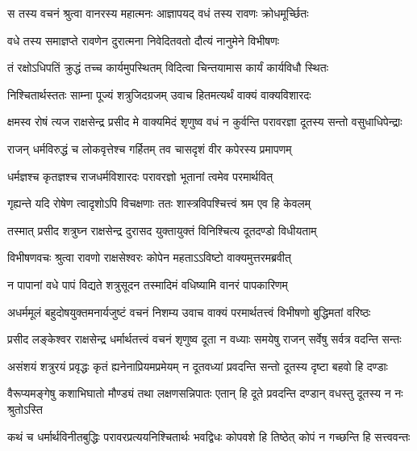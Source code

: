 
\twolineshloka
{स तस्य वचनं श्रुत्वा वानरस्य महात्मनः}
{आज्ञापयद् वधं तस्य रावणः क्रोधमूर्च्छितः} %

\twolineshloka
{वधे तस्य समाज्ञप्ते रावणेन दुरात्मना}
{निवेदितवतो दौत्यं नानुमेने विभीषणः} %

\twolineshloka
{तं रक्षोऽधिपतिं क्रुद्धं तच्च कार्यमुपस्थितम्}
{विदित्वा चिन्तयामास कार्यं कार्यविधौ स्थितः} %

\twolineshloka
{निश्चितार्थस्ततः साम्ना पूज्यं शत्रुजिदग्रजम्}
{उवाच हितमत्यर्थं वाक्यं वाक्यविशारदः} %

\twolineshloka
{क्षमस्व रोषं त्यज राक्षसेन्द्र प्रसीद मे वाक्यमिदं शृणुष्व}
{वधं न कुर्वन्ति परावरज्ञा दूतस्य सन्तो वसुधाधिपेन्द्राः} %

\twolineshloka
{राजन् धर्मविरुद्धं च लोकवृत्तेश्च गर्हितम्}
{तव चासदृशं वीर कपेरस्य प्रमापणम्} %

\twolineshloka
{धर्मज्ञश्च कृतज्ञश्च राजधर्मविशारदः}
{परावरज्ञो भूतानां त्वमेव परमार्थवित्} %

\twolineshloka
{गृह्यन्ते यदि रोषेण त्वादृशोऽपि विचक्षणाः}
{ततः शास्त्रविपश्चित्त्वं श्रम एव हि केवलम्} %

\twolineshloka
{तस्मात् प्रसीद शत्रुघ्न राक्षसेन्द्र दुरासद}
{युक्तायुक्तं विनिश्चित्य दूतदण्डो विधीयताम्} %

\twolineshloka
{विभीषणवचः श्रुत्वा रावणो राक्षसेश्वरः}
{कोपेन महताऽऽविष्टो वाक्यमुत्तरमब्रवीत्} %

\twolineshloka
{न पापानां वधे पापं विद्यते शत्रुसूदन}
{तस्मादिमं वधिष्यामि वानरं पापकारिणम्} %

\twolineshloka
{अधर्ममूलं बहुदोषयुक्तमनार्यजुष्टं वचनं निशम्य}
{उवाच वाक्यं परमार्थतत्त्वं विभीषणो बुद्धिमतां वरिष्ठः} %

\twolineshloka
{प्रसीद लङ्केश्वर राक्षसेन्द्र धर्मार्थतत्त्वं वचनं शृणुष्व}
{दूता न वध्याः समयेषु राजन् सर्वेषु सर्वत्र वदन्ति सन्तः} %

\twolineshloka
{असंशयं शत्रुरयं प्रवृद्धः कृतं ह्यनेनाप्रियमप्रमेयम्}
{न दूतवध्यां प्रवदन्ति सन्तो दूतस्य दृष्टा बहवो हि दण्डाः} %

\twolineshloka
{वैरूप्यमङ्गेषु कशाभिघातो मौण्ड्यं तथा लक्षणसन्निपातः}
{एतान् हि दूते प्रवदन्ति दण्डान् वधस्तु दूतस्य न नः श्रुतोऽस्ति} %

\twolineshloka
{कथं च धर्मार्थविनीतबुद्धिः परावरप्रत्ययनिश्चितार्थः}
{भवद्विधः कोपवशे हि तिष्ठेत् कोपं न गच्छन्ति हि सत्त्ववन्तः} %


